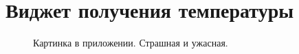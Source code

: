 \chapter{Виджет получения температуры}
\label{cha:temp}

\begin{figure}
	\centering
	\caption{Картинка в приложении. Страшная и ужасная.}
\end{figure}